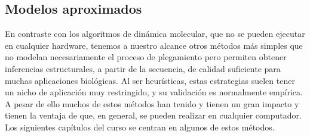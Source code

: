 \subsection{Modelos aproximados}

En contraste con los algoritmos de din\'{a}mica molecular, que no se pueden ejecutar en cualquier hardware,
tenemos a nuestro alcance otros m\'{e}todos m\'{a}s simples  
que no modelan necesariamente el proceso de plegamiento pero permiten obtener inferencias estructurales, 
a partir de la secuencia, de calidad suficiente para muchas aplicaciones biol\'{o}gicas. 
Al ser heur\'{i}sticas, estas estrategias suelen tener un nicho
de aplicaci\'{o}n muy restringido, y su validaci\'{o}n es normalmente emp\'{i}rica. 
A pesar de ello muchos de estos m\'{e}todos han tenido y tienen un gran impacto y 
tienen la ventaja de que, en general, se pueden realizar en cualquier computador. 
Los siguientes cap\'{i}tulos del curso se centran en algunos de estos m\'{e}todos.

